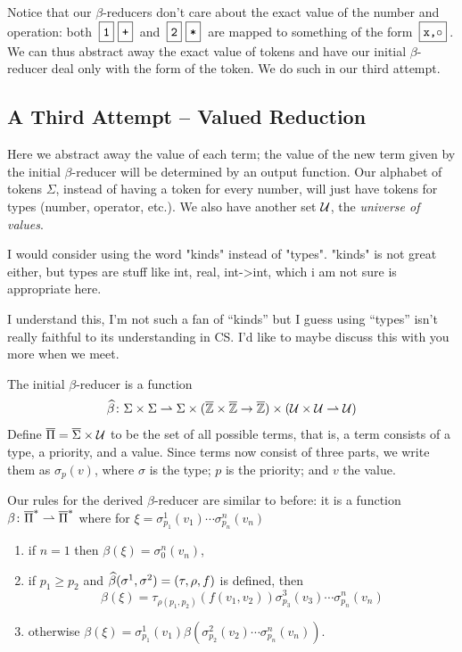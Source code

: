 \documentclass{llncs}
\newcommand{\yoni}[1]{{\begin{mdframed}[linecolor=red]{\color{red}#1}\end{mdframed}}}
\newcommand{\ari}[1]{{\begin{mdframed}[linecolor=blue]{\color{blue}#1}\end{mdframed}}}
\begin{document}
Notice that our $\beta$-reducers don't care about the exact value of the number and operation: both $\mbt1\mbt+$ and $\mbt2\mbt*$ are mapped to something of the form $\mbt{x,$\circ$}$.
We can thus abstract away the exact value of tokens and have our initial $\beta$-reducer deal only with the form of the token.
We do such in our third attempt.

\subsection{A Third Attempt -- Valued Reduction} \label{valued-reduction}

Here we abstract away the value of each term; the value of the new term given by the initial $\beta$-reducer will be determined by an output function.
Our alphabet of tokens $\Sigma$, instead of having a token for every number, will just have tokens for types (number, operator, etc.).
We also have another set $\mathcal U$, the \textit{universe of values}.

\yoni{I would consider using the word "kinds" instead of "types". "kinds" is not great either, but types are stuff like int, real, int->int, which i am not sure is appropriate here.}
\ari{I understand this, I'm not such a fan of ``kinds'' but I guess using ``types'' isn't really faithful to its understanding in CS.
I'd like to maybe discuss this with you more when we meet.}

The initial $\beta$-reducer is a function
\[ \widehat\beta \colon \Sigma\times\Sigma \rightharpoonup \Sigma\times(\overline{\mathbb Z}\times\overline{\mathbb Z}\to\overline{\mathbb Z})\times(\mathcal U\times\mathcal U\rightharpoonup\mathcal U) \]
Define $\overline\Pi=\overline\Sigma\times\mathcal U$ to be the set of all possible terms,
that is, 
a term consists of a type, a priority, and a value.
Since terms now consist of three parts, we write them as $\sigma_p(v)$, where $\sigma$ is the type; $p$ is the priority; and $v$ the value.

Our rules for the derived $\beta$-reducer are similar to before: it is a function $\beta\colon\overline\Pi^* \rightharpoonup \overline\Pi^*$ where for $\xi=\sigma^1_{p_1}(v_1)\cdots\sigma^n_{p_n}(v_n)$
\begin{enumerate}
    \item if $n=1$ then $\beta(\xi)=\sigma^n_0(v_n)$,
    \item if $p_1\geq p_2$ and $\widehat\beta(\sigma^1,\sigma^2)=(\tau,\rho,f)$ is defined, then
    \[ \beta(\xi)=\tau_{\rho(p_1,p_2)}(f(v_1,v_2))\sigma^3_{p_3}(v_3)\cdots\sigma^n_{p_n}(v_n) \]
    \item otherwise $\beta(\xi)=\sigma^1_{p_1}(v_1)\beta(\sigma^2_{p_2}(v_2)\cdots\sigma^n_{p_n}(v_n))$.
\end{enumerate}
\end{document}
